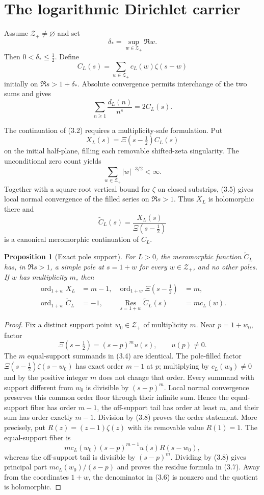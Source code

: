 \documentclass[11pt]{article}
\newtheorem{proposition}[theorem]{Proposition}
\newcommand{\XiR}{\Xi}
\newcommand{\cZ}{\mathcal Z}
\newcommand{\ord}{\operatorname{ord}}
\begin{document}
\section{The logarithmic Dirichlet carrier}

Assume $\cZ_+\ne\varnothing$ and set
\[
  \delta_* = \sup_{w\in\cZ_+}\Re w.
  \tag{3.1}
\]
Then $0<\delta_*\le\frac12$.  Define
\[
  C_L(s)=\sum_{w\in\cZ_+}c_L(w)\zeta(s-w)
  \tag{3.2}
\]
initially on $\Re s>1+\delta_*$.  Absolute convergence permits interchange of the two sums and
gives
\[
  \sum_{n\ge1}\frac{d_L(n)}{n^s}=2C_L(s).
  \tag{3.3}
\]

The continuation of (3.2) requires a multiplicity-safe formulation.  Put
\[
  X_L(s)=\XiR(s-\tfrac12)C_L(s)
  \tag{3.4}
\]
on the initial half-plane, filling each removable shifted-zeta singularity.  The unconditional
zero count yields
\[
  \sum_{w\in\cZ_+}|w|^{-3/2}<\infty.
  \tag{3.5}
\]
Together with a square-root vertical bound for $\zeta$ on closed substrips, (3.5) gives local
normal convergence of the filled series on $\Re s>1$.  Thus $X_L$ is holomorphic there and
\[
  \widetilde C_L(s)=\frac{X_L(s)}{\XiR(s-\tfrac12)}
  \tag{3.6}
\]
is a canonical meromorphic continuation of $C_L$.

\begin{proposition}[Exact pole support]\label{prop:poles}
For $L>0$, the meromorphic function $\widetilde C_L$ has, in $\Re s>1$, a simple pole at
$s=1+w$ for every $w\in\cZ_+$, and no other poles.  If $w$ has multiplicity $m$, then
\[
  \begin{aligned}
  \ord_{1+w}X_L&=m-1,
  &\ord_{1+w}\XiR(s-\tfrac12)&=m,\\
  \ord_{1+w}\widetilde C_L&=-1,
  &\operatorname*{Res}_{s=1+w}\widetilde C_L(s)&=m c_L(w).
  \end{aligned}
  \tag{3.7}
\]
\end{proposition}

\begin{proof}
Fix a distinct support point $w_0\in\cZ_+$ of multiplicity $m$.  Near $p=1+w_0$, factor
\[
  \XiR(s-\tfrac12)=(s-p)^m u(s),\qquad u(p)\ne0.
  \tag{3.8}
\]
The $m$ equal-support summands in (3.4) are identical.  The pole-filled factor
$\XiR(s-\frac12)\zeta(s-w_0)$ has exact order $m-1$ at $p$; multiplying by
$c_L(w_0)\ne0$ and by the positive integer $m$ does not change that order.  Every summand with
support different from $w_0$ is divisible by $(s-p)^m$.  Local normal convergence preserves this
common order floor through their infinite sum.  Hence the equal-support fiber has order $m-1$,
the off-support tail has order at least $m$, and their sum has order exactly $m-1$.  Division by
(3.8) proves the order statement.  More precisely, put
$R(z)=(z-1)\zeta(z)$ with its removable value $R(1)=1$.  The equal-support fiber is
\[
  m c_L(w_0)(s-p)^{m-1}u(s)R(s-w_0),
\]
whereas the off-support tail is divisible by $(s-p)^m$.  Dividing by (3.8) gives principal part
$m c_L(w_0)/(s-p)$ and proves the residue formula in (3.7).  Away from the coordinates $1+w$,
the denominator in (3.6) is nonzero and the
quotient is holomorphic.
\end{proof}
\end{document}
